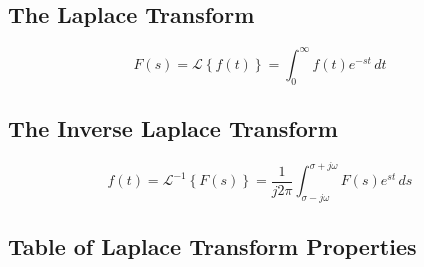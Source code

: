 

\subsection*{The Laplace Transform}
$$
F(s)=\mathcal{L}\left\{f(t)\right\}=\int_0^{\infty} f(t)e^{-st}\, dt
$$
\subsection*{The Inverse Laplace Transform}
$$
f(t)=\mathcal{L}^{-1}\left\{F(s)\right\}=\frac{1}{j2\pi}\int_{\sigma-j\omega}^{\sigma+j\omega} F(s)e^{st}\, ds
$$
\subsection*{Table of Laplace Transform Properties}

